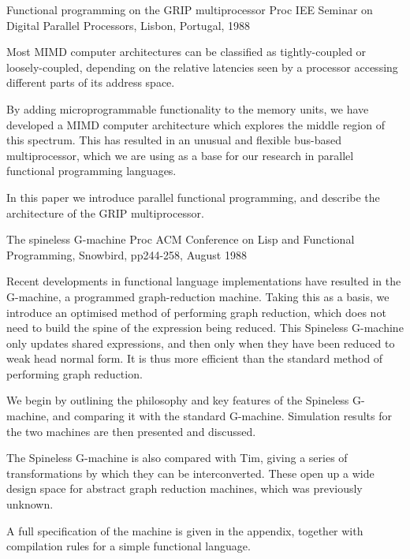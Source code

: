{Functional programming on the GRIP multiprocessor}
{Proc IEE Seminar on Digital Parallel Processors, Lisbon, Portugal, 1988}
{
Most MIMD computer architectures can be classified as 
tightly-coupled or loosely-coupled,
depending on the relative latencies seen by a processor accessing different
parts of its address space.

By adding microprogrammable functionality to the memory units, we have
developed a MIMD computer architecture which explores the middle region
of this spectrum.
This has resulted in an unusual and flexible bus-based multiprocessor,
which we are using as a base for our research in parallel functional programming
languages.

In this paper we introduce parallel functional programming, and describe
the architecture of the GRIP multiprocessor.
}

{The spineless G-machine}
{Proc ACM Conference on Lisp and Functional Programming, Snowbird, pp244-258,
August 1988}
{
Recent developments in functional language implementations have
resulted in the G-machine, a programmed graph-reduction machine.
Taking this as a basis, we introduce an optimised method of
performing graph reduction, which does not need to build the
spine of the expression being reduced.
This Spineless G-machine only updates shared expressions, and
then only when they have been reduced to weak head normal form.
It is thus more efficient than the standard method of performing
graph reduction.

We begin by outlining the philosophy and key features of the
Spineless G-machine, and comparing it with the standard
G-machine.
Simulation results for the two machines are then presented and
discussed.

The Spineless G-machine is also compared with Tim, giving a
series of transformations by which they can be interconverted.
These open up a wide design space for abstract graph reduction
machines, which was previously unknown.

A full specification of the machine is given in the appendix,
together with compilation rules for a simple functional language.
}

